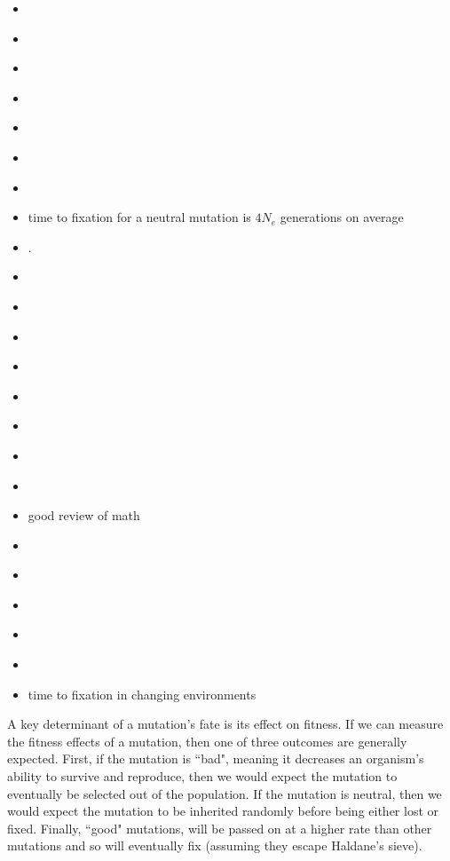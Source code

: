 \begin{itemize}
    \item \citep{fisher_xxidominance_1923}
    \item \citep{haldane_mathematical_1927}
    \item \citep{wright_evolution_1931}
    \item \citep{darling_first_1953}
    \item \citep{feller_diffusion_1954}
    \item \citep{watterson_theoretical_1962}
    \item \citep{ewens_mean_1963}
    \item time to fixation for a neutral mutation is $4N_e$ generations on average  \citep{kimura_average_1969}
    \item \citep{kimura_average_1980}.
    \item \citep{kimura_probability_1970}
    \item \citep{kimura_probability_1974}
    \item \citep{burrows_distributions_1974}
    \item \citep{ohta_time_1983}
    \item \citep{przeworski_signature_2002}
    \item \citep{przeworski_estimating_2003}
    \item \citep{malaspinas_estimating_2012}
    \item \citep{chen_inferring_2013}
    \item good review of math \citep{otto_fixation_2013}
    \item \citep{greven_fixation_2016}
    \item \citep{ormond_inferring_2016}
    \item \citep{schraiber_bayesian_2016}
    \item \citep{stern_approximate_2019}
    \item \citep{nakagome_inferring_2019}
    \item time to fixation in changing environments \citep{cui_fixation_2018, kaushik_time_2021}
\end{itemize}

A key determinant of a mutation's fate is its effect on fitness. If we can measure the fitness effects of a mutation, then one of three outcomes are generally expected. First, if the mutation is ``bad", meaning it decreases an organism's ability to survive and reproduce, then we would expect the mutation to eventually be selected out of the population. If the mutation is neutral, then we would expect the mutation to be inherited randomly before being either lost or fixed. Finally, ``good" mutations, will be passed on at a higher rate than other mutations and so will eventually fix (assuming they escape Haldane's sieve).





